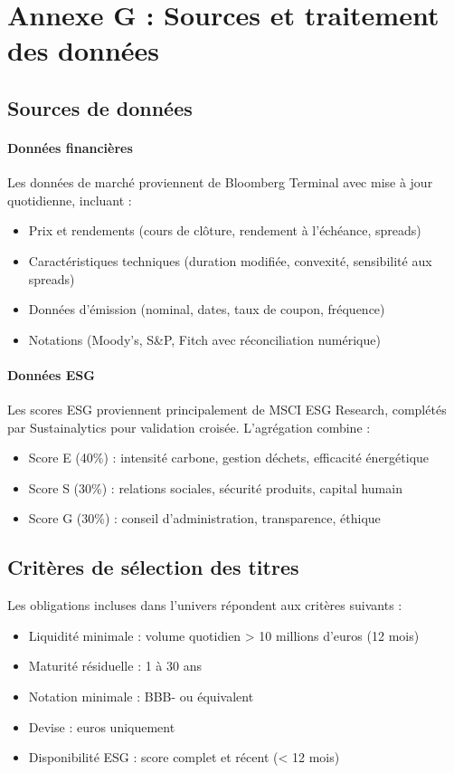 \section{Annexe G : Sources et traitement des données}

\subsection{Sources de données}

\paragraph{Données financières}
Les données de marché proviennent de Bloomberg Terminal avec mise à jour quotidienne, incluant :
\begin{itemize}
\item Prix et rendements (cours de clôture, rendement à l'échéance, spreads)
\item Caractéristiques techniques (duration modifiée, convexité, sensibilité aux spreads)
\item Données d'émission (nominal, dates, taux de coupon, fréquence)
\item Notations (Moody's, S\&P, Fitch avec réconciliation numérique)
\end{itemize}

\paragraph{Données ESG}
Les scores ESG proviennent principalement de MSCI ESG Research, complétés par Sustainalytics pour validation croisée. L'agrégation combine :
\begin{itemize}
\item Score E (40\%) : intensité carbone, gestion déchets, efficacité énergétique
\item Score S (30\%) : relations sociales, sécurité produits, capital humain
\item Score G (30\%) : conseil d'administration, transparence, éthique
\end{itemize}

\subsection{Critères de sélection des titres}

Les obligations incluses dans l'univers répondent aux critères suivants :
\begin{itemize}
\item Liquidité minimale : volume quotidien > 10 millions d'euros (12 mois)
\item Maturité résiduelle : 1 à 30 ans
\item Notation minimale : BBB- ou équivalent
\item Devise : euros uniquement
\item Disponibilité ESG : score complet et récent (< 12 mois)
\end{itemize}

